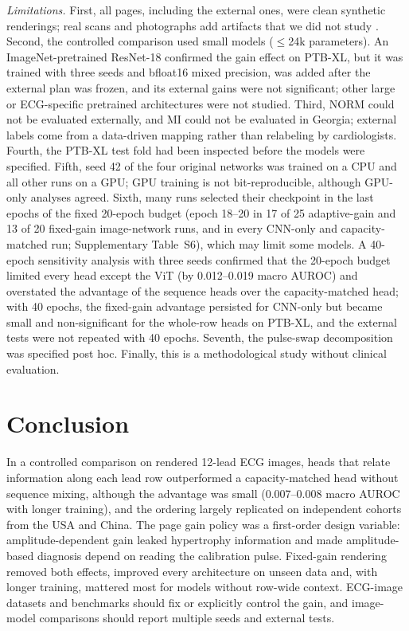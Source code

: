 \documentclass[journal]{IEEEtran}
\begin{document}
\emph{Limitations.} First, all pages, including the external ones, were clean synthetic renderings; real scans and photographs add artifacts that we did not study \cite{shivashankara2024ecgimagekit,reyna2024challenge}. Second, the controlled comparison used small models ($\le$24k parameters). An ImageNet-pretrained ResNet-18 confirmed the gain effect on PTB-XL, but it was trained with three seeds and bfloat16 mixed precision, was added after the external plan was frozen, and its external gains were not significant; other large or ECG-specific pretrained architectures were not studied. Third, NORM could not be evaluated externally, and MI could not be evaluated in Georgia; external labels come from a data-driven mapping rather than relabeling by cardiologists. Fourth, the PTB-XL test fold had been inspected before the models were specified. Fifth, seed 42 of the four original networks was trained on a CPU and all other runs on a GPU; GPU training is not bit-reproducible, although GPU-only analyses agreed. Sixth, many runs selected their checkpoint in the last epochs of the fixed 20-epoch budget (epoch 18--20 in 17 of 25 adaptive-gain and 13 of 20 fixed-gain image-network runs, and in every CNN-only and capacity-matched run; Supplementary Table~S6), which may limit some models. A 40-epoch sensitivity analysis with three seeds confirmed that the 20-epoch budget limited every head except the ViT (by 0.012--0.019 macro AUROC) and overstated the advantage of the sequence heads over the capacity-matched head; with 40 epochs, the fixed-gain advantage persisted for CNN-only but became small and non-significant for the whole-row heads on PTB-XL, and the external tests were not repeated with 40 epochs. Seventh, the pulse-swap decomposition was specified post hoc. Finally, this is a methodological study without clinical evaluation.

\section{Conclusion}
In a controlled comparison on rendered 12-lead ECG images, heads that relate information along each lead row outperformed a capacity-matched head without sequence mixing, although the advantage was small (0.007--0.008 macro AUROC with longer training), and the ordering largely replicated on independent cohorts from the USA and China. The page gain policy was a first-order design variable: amplitude-dependent gain leaked hypertrophy information and made amplitude-based diagnosis depend on reading the calibration pulse. Fixed-gain rendering removed both effects, improved every architecture on unseen data and, with longer training, mattered most for models without row-wide context. ECG-image datasets and benchmarks should fix or explicitly control the gain, and image-model comparisons should report multiple seeds and external tests.
\end{document}
